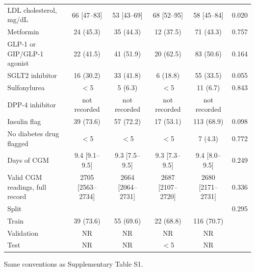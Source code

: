 \begin{table}[htbp]
\begin{tabular}{lccccc}
LDL cholesterol, mg/dL & 66 [47--83] & 53 [43--69] & 68 [52--95] & 58 [45--84] & 0.020 \\
Metformin & 24 (45.3) & 35 (44.3) & 12 (37.5) & 71 (43.3) & 0.757 \\
GLP-1 or GIP/GLP-1 agonist & 22 (41.5) & 41 (51.9) & 20 (62.5) & 83 (50.6) & 0.164 \\
SGLT2 inhibitor & 16 (30.2) & 33 (41.8) & 6 (18.8) & 55 (33.5) & 0.055 \\
Sulfonylurea & $<$5 & 5 (6.3) & $<$5 & 11 (6.7) & 0.843 \\
DPP-4 inhibitor & not recorded & not recorded & not recorded & not recorded &  \\
Insulin flag & 39 (73.6) & 57 (72.2) & 17 (53.1) & 113 (68.9) & 0.098 \\
No diabetes drug flagged & $<$5 & $<$5 & $<$5 & 7 (4.3) & 0.772 \\
Days of CGM & 9.4 [9.1--9.5] & 9.3 [7.5--9.5] & 9.3 [7.3--9.5] & 9.4 [8.0--9.5] & 0.249 \\
Valid CGM readings, full record & 2705 [2563--2734] & 2664 [2064--2731] & 2687 [2107--2720] & 2680 [2171--2731] & 0.336 \\
Split &  &  &  &  & 0.295 \\
\hspace{1em}Train & 39 (73.6) & 55 (69.6) & 22 (68.8) & 116 (70.7) &  \\
\hspace{1em}Validation & NR & NR & NR & NR &  \\
\hspace{1em}Test & NR & NR & $<$5 & NR &  \\
\bottomrule
\end{tabular}
\par\smallskip
\begin{minipage}{\linewidth}\scriptsize
Same conventions as Supplementary Table S1.
\end{minipage}
\end{table}
